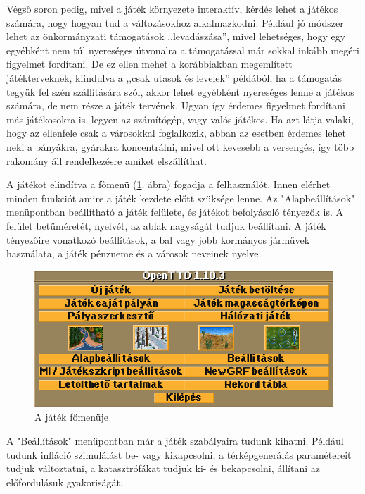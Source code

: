 Végső soron pedig, mivel a játék környezete interaktív, kérdés lehet a játékos számára, hogy hogyan tud a változásokhoz alkalmazkodni. Például jó módszer lehet az önkormányzati támogatások ,,levadászása'', mivel lehetséges, hogy egy egyébként nem túl nyereséges útvonalra a támogatással már sokkal inkább megéri figyelmet fordítani. De ez ellen mehet a korábbiakban megemlített játékterveknek, kiindulva a ,,csak utasok és levelek'' példából, ha a támogatás tegyük fel szén szállítására szól, akkor lehet egyébként nyereséges lenne a játékos számára, de nem része a játék tervének. Ugyan így érdemes figyelmet fordítani más játékosokra is, legyen az számítógép, vagy valós játékos. Ha azt látja valaki, hogy az ellenfele csak a városokkal foglalkozik, abban az esetben érdemes lehet neki a bányákra, gyárakra koncentrálni, mivel ott kevesebb a versengés, így több rakomány áll rendelkezésre amiket elszállíthat.


A játékot elindítva a főmenü (\ref{fig:menu}. ábra) fogadja a felhasználót. Innen elérhet minden funkciót amire a játék kezdete előtt szüksége lenne. Az "Alapbeállítások" menüpontban beállítható a játék felülete, és játékot befolyásoló tényezők is. A felület betűméretét, nyelvét, az ablak nagyságát tudjuk beállítani. A játék tényezőire vonatkozó beállítások, a bal vagy jobb kormányos járművek használata, a játék pénzneme és a városok neveinek nyelve.

\begin{figure}[h!]
	\centering
	\includegraphics[scale=0.8]{images/menu.png}
	\caption{A játék főmenüje}
	\label{fig:menu}
\end{figure}

A "Beállítások" menüpontban már a játék szabályaira tudunk kihatni. Például tudunk infláció szimulálást be- vagy kikapcsolni, a térképgenerálás paramétereit tudjuk változtatni, a katasztrófákat tudjuk ki- és bekapcsolni, állítani az előfordulásuk gyakoriságát.

